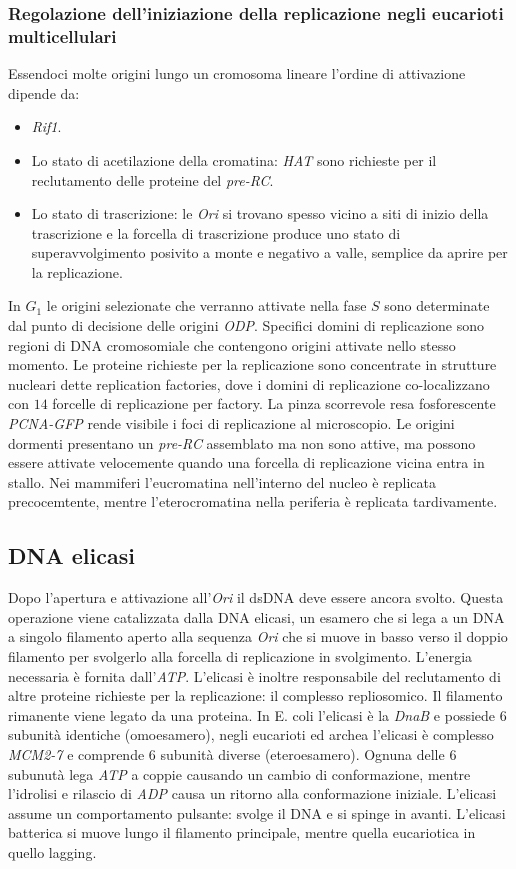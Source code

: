 \subsubsection{Regolazione dell'iniziazione della replicazione negli eucarioti multicellulari}
Essendoci molte origini lungo un cromosoma lineare l'ordine di attivazione dipende da:
\begin{itemize}
	\item \emph{Rif1}.
	\item Lo stato di acetilazione della cromatina: \emph{HAT} sono richieste per il reclutamento delle proteine del \emph{pre-RC}.
	\item Lo stato di trascrizione: le \emph{Ori} si trovano spesso vicino a siti di inizio della trascrizione e la forcella di trascrizione produce uno stato di superavvolgimento 
		posivito a monte e negativo a valle, semplice da aprire per la replicazione.
\end{itemize}
In $G_1$ le origini selezionate che verranno attivate nella fase $S$ sono determinate dal punto di decisione delle origini \emph{ODP}. Specifici domini di replicazione sono regioni di 
DNA cromosomiale che contengono origini attivate nello stesso momento. Le proteine richieste per la replicazione sono concentrate in strutture nucleari dette replication factories, dove 
i domini di replicazione co-localizzano con $14$ forcelle di replicazione per factory. La pinza scorrevole resa fosforescente \emph{PCNA-GFP} rende visibile i foci di replicazione al 
microscopio. Le origini dormenti presentano un \emph{pre-RC} assemblato ma non sono attive, ma possono essere attivate velocemente quando una forcella di replicazione vicina entra in 
stallo. Nei mammiferi l'eucromatina nell'interno del nucleo \`e replicata precocemtente, mentre l'eterocromatina nella periferia \`e replicata tardivamente. 
\subsection{DNA elicasi} 
Dopo l'apertura e attivazione all'\emph{Ori} il dsDNA deve essere ancora svolto. Questa operazione viene catalizzata dalla DNA elicasi, un esamero che si lega a un DNA a singolo filamento
aperto alla sequenza \emph{Ori} che si muove in basso verso il doppio filamento per svolgerlo alla forcella di replicazione in svolgimento. L'energia necessaria \`e fornita 
dall'\emph{ATP}. L'elicasi \`e inoltre responsabile del reclutamento di altre proteine richieste per la replicazione: il complesso repliosomico. Il filamento rimanente viene legato 
da una proteina. In E. coli l'elicasi \`e la \emph{DnaB} e possiede $6$ subunit\`a identiche (omoesamero), negli eucarioti ed archea l'elicasi \`e complesso \emph{MCM2-7} e comprende
$6$ subunit\`a diverse (eteroesamero). Ognuna delle $6$ subunut\`a lega \emph{ATP} a coppie causando un cambio di conformazione, mentre l'idrolisi e rilascio di \emph{ADP} causa un
ritorno alla conformazione iniziale. L'elicasi assume un comportamento pulsante: svolge il DNA e si spinge in avanti. L'elicasi batterica si muove lungo il filamento principale, mentre 
quella eucariotica in quello lagging. 
